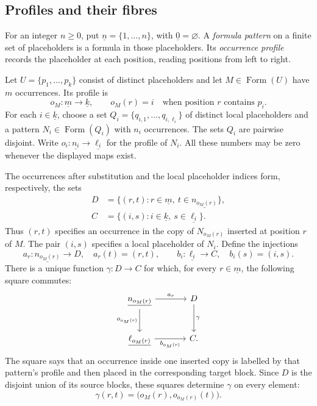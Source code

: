 \documentclass[11pt]{article}
\newcommand{\FormulaSet}{\operatorname{Form}}
\begin{document}
\subsection{Profiles and their fibres}\label{app:profiles}

For an integer $n\geq0$, put $\underline n=\{1,\ldots,n\}$, with
$\underline0=\varnothing$. A \emph{formula pattern} on a finite set
of placeholders is a formula in those placeholders. Its
\emph{occurrence profile} records the placeholder at each position,
reading positions from left to right.

Let $U=\{p_1,\ldots,p_k\}$ consist of distinct placeholders and let
$M\in\FormulaSet(U)$ have $m$ occurrences. Its profile is
\[
 o_M:\underline m\longrightarrow\underline k,
 \qquad o_M(r)=i\quad\text{when position $r$ contains $p_i$}.
\]
For each $i\in\underline k$, choose a set
$Q_i=\{q_{i,1},\ldots,q_{i,\ell_i}\}$ of distinct local placeholders and a
pattern $N_i\in\FormulaSet(Q_i)$ with $n_i$ occurrences. The sets
$Q_i$ are pairwise disjoint. Write
$o_i:\underline{n_i}\to\underline{\ell_i}$ for the profile of $N_i$.
All these numbers may be zero whenever the displayed maps exist.

The occurrences after substitution and the local placeholder indices
form, respectively, the sets
\[
 \begin{aligned}
 D&=\{(r,t):r\in\underline m,\ t\in\underline{n_{o_M(r)}}\},\\
 C&=\{(i,s):i\in\underline k,\ s\in\underline{\ell_i}\}.
 \end{aligned}
\]
Thus $(r,t)$ specifies an occurrence in the copy of $N_{o_M(r)}$
inserted at position $r$ of $M$. The pair $(i,s)$ specifies a local
placeholder of $N_i$. Define the injections
\[
 a_r:\underline{n_{o_M(r)}}\longrightarrow D,\quad a_r(t)=(r,t),
 \qquad
 b_i:\underline{\ell_i}\longrightarrow C,\quad b_i(s)=(i,s).
\]
There is a unique function $\gamma:D\to C$ for which, for every
$r\in\underline m$, the following square commutes:
\begin{equation}\label{eq:app-fibre}
\begin{tikzcd}[column sep=large,row sep=large]
 \underline{n_{o_M(r)}}\arrow[r,"a_r"]\arrow[d,"o_{o_M(r)}"']
   &D\arrow[d,"\gamma"]\\
 \underline{\ell_{o_M(r)}}\arrow[r,"b_{o_M(r)}"']&C.
\end{tikzcd}
\end{equation}
The square says that an occurrence inside one inserted copy is labelled
by that pattern's profile and then placed in the corresponding target
block. Since $D$ is the disjoint union of its source blocks, these
squares determine $\gamma$ on every element:
\[
 \gamma(r,t)=\bigl(o_M(r),o_{o_M(r)}(t)\bigr).
\]
\end{document}
